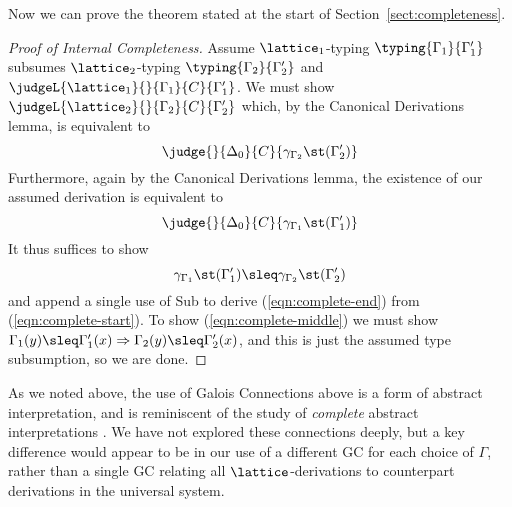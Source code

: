 \documentclass{sigplanconf}
\begin{document}
Now we can prove the theorem stated at the start of Section~\ref{sect:completeness}.
\begin{proof}[Proof of Internal Completeness]
Assume 
$\lattice_1$-typing $\typing{\Gamma_1}{\Gamma'_1}$ subsumes
$\lattice_2$-typing $\typing{\Gamma_2}{\Gamma'_2}$ and
$\judgeL{\lattice_1}{}{\Gamma_1}{C}{\Gamma'_1}$.
We must show $\judgeL{\lattice_2}{}{\Gamma_2}{C}{\Gamma'_2}$ which,
by the Canonical Derivations lemma, is equivalent to
\begin{equation}\label{eqn:complete-end}
    \judge{}{\Delta_0}{C}{\gamma_{\Gamma_2}\st(\Gamma'_2)}
\end{equation}
Furthermore, again by the Canonical Derivations lemma, the existence
of our assumed derivation is equivalent to
\begin{equation}\label{eqn:complete-start}
    \judge{}{\Delta_0}{C}{\gamma_{\Gamma_1}\st(\Gamma'_1)}
\end{equation}
It thus suffices to show
\begin{equation}\label{eqn:complete-middle}
    \gamma_{\Gamma_1}\st(\Gamma'_1) \sleq \gamma_{\Gamma_2}\st(\Gamma'_2)
\end{equation}
and append a single use of Sub to derive (\ref{eqn:complete-end}) from (\ref{eqn:complete-start}).
To show (\ref{eqn:complete-middle}) we must show
$\Gamma_1(y) \sleq \Gamma'_1(x) => \Gamma_2(y) \sleq \Gamma'_2(x)$,
and this is just the assumed type subsumption, so we are done.
\end{proof}
As we noted above, the use of Galois Connections above
is a form of abstract interpretation, and is reminiscent 
of the study of \emph{complete} abstract interpretations
\cite{CousotCousot79-1,GiacobazziRanzatoScozzari}.
We have not explored these connections deeply, but a key difference
would appear to be in our use of a different GC for each choice of
$\Gamma$, rather than a single GC relating all
$\lattice$-derivations to counterpart
derivations in the universal system.
\end{document}
